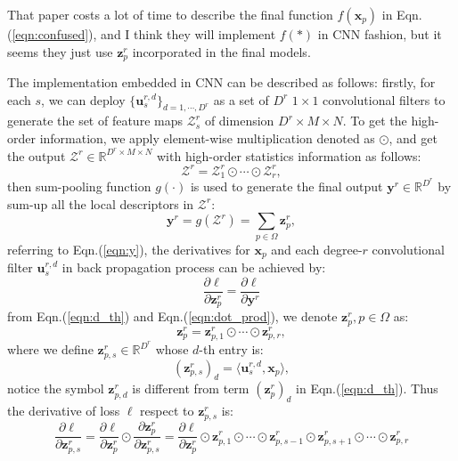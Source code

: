 \documentclass[a4paper,4pt]{article}
\begin{document}
That paper costs a lot of time to describe the final function $f(\bm{x}_p)$ in Eqn.(\ref{eqn:confused}),
and I think they 
will implement $f(*)$ in CNN fashion, but it seems they just use $\bm{z}^r_p$ incorporated in
the final models.

The implementation embedded in CNN can be described as follows: firstly, for each $s$, we can deploy 
$\{ \bm{u}^{r,d}_s \}_{d=1,\cdots,D^r}$ as a set of $D^r$ $1\times 1$ convolutional filters
to generate the set of feature maps $\bm{\mathcal{Z}}^r_s$ of dimension $D^r \times M \times N$.
To get the high-order information, we apply element-wise multiplication denoted as $\odot$, and get
the output $\bm{\mathcal{Z}}^r \in \mathbb{R}^{D^r \times M \times N}$
with high-order statistics information as follows:
\begin{equation}\label{eqn:dot_prod}
    \bm{\mathcal{Z}}^r=\bm{\mathcal{Z}}^r_1 \odot \cdots \odot \bm{\mathcal{Z}}^r_{r},
\end{equation}
then sum-pooling function $g(\cdot)$ is used to generate the final output
$\bm{y}^r \in \mathbb{R}^{D^r}$ by sum-up all the local descriptors in $\bm{\mathcal{Z}}^r$:
\begin{equation}\label{eqn:y}
    \bm{y}^r=g(\bm{\mathcal{Z}}^r)=\sum_{p\in\Omega}{\bm{z}^r_p},
\end{equation}
referring to Eqn.(\ref{eqn:y}), the derivatives for $\bm{x}_p$ and each
degree-$r$ convolutional filter $\bm{u}^{r,d}_s$ in back propagation process 
can be achieved by:
\begin{equation}
    \frac{\partial \ell}{\partial \bm{z}^r_p}=
    \frac{\partial \ell }{\partial \bm{y}^r }
\end{equation}
from Eqn.(\ref{eqn:d_th}) and Eqn.(\ref{eqn:dot_prod}), we denote $\bm{z}^r_p, p\in \Omega$ as:
\begin{equation}
    \bm{z}^r_p=\bm{z}^r_{p,1}\odot\cdots\odot \bm{z}^r_{p,r},   
\end{equation}
where we define $\bm{z}^r_{p,s} \in \mathbb{R}^{D^r} $ whose $d$-th entry is: 
\begin{equation}
    (\bm{z}^r_{p,s})_d=\langle \bm{u}_s^{r,d}, \bm{x}_p \rangle,
\end{equation}
notice the symbol $\bm{z}^r_{p,d}$ is different from term $(\bm{z}^r_p)_d$ in Eqn.(\ref{eqn:d_th}).
Thus the  derivative of loss $\ell$ respect to $\bm{z}^r_{p,s}$ is:
\begin{equation}
    \frac{\partial \ell}{\partial \bm{z}^r_{p,s} }
    =\frac{\partial \ell}{\partial \bm{z}^r_{p}} \odot \frac{\partial \bm{z}^r_p}{\partial \bm{z}^r_{p,s}}
    =\frac{\partial \ell}{\partial \bm{z}^r_p}\odot 
    \bm{z}^r_{p,1} \odot\cdots \odot \bm{z}^r_{p,s-1} \odot \bm{z}^r_{p,s+1}  \odot \cdots \odot \bm{z}^r_{p,r}
\end{equation} 
\end{document}
